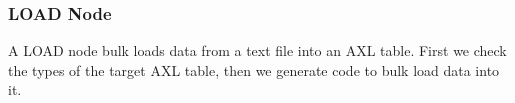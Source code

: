 \subsubsection*{LOAD Node}
A LOAD node bulk loads data from a text file into an AXL table. First
we check the types of the target AXL table, then we generate code to
bulk load data into it.

